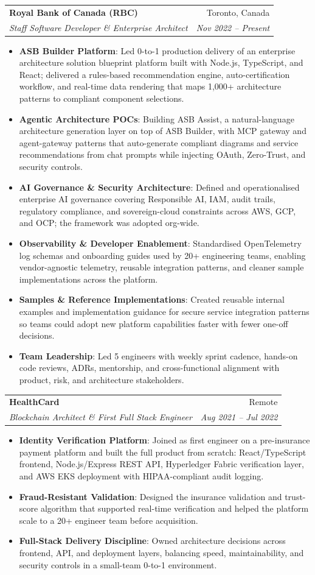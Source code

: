 \documentclass[letterpaper,9.5pt]{article}
\makeatletter
\newcommand{\resumeItem}[2]{
  \item\small{
    \textbf{#1}{: #2 \vspace{-2pt}}
  }
}
\newcommand{\resumeSubheading}[4]{
  \vspace{-1pt}\item
    \begin{tabular*}{0.97\textwidth}{l@{\extracolsep{\fill}}r}
      \textbf{#1} & #2 \\
      \textit{\small#3} & \textit{\small #4} \\
    \end{tabular*}\vspace{-5pt}
}
\newcommand{\resumeItemListStart}{\begin{itemize}}
\newcommand{\resumeItemListEnd}{\end{itemize}\vspace{-5pt}}
\makeatother
\begin{document}
  \resumeSubheading
    {Royal Bank of Canada (RBC)}{Toronto, Canada}
    {Staff Software Developer \& Enterprise Architect}{Nov 2022 -- Present}
    \resumeItemListStart
      \resumeItem{ASB Builder Platform}
        {Led 0-to-1 production delivery of an enterprise architecture solution blueprint platform built with Node.js, TypeScript, and React; delivered a rules-based recommendation engine, auto-certification workflow, and real-time data rendering that maps 1,000+ architecture patterns to compliant component selections.}
      \resumeItem{Agentic Architecture POCs}
        {Building ASB Assist, a natural-language architecture generation layer on top of ASB Builder, with MCP gateway and agent-gateway patterns that auto-generate compliant diagrams and service recommendations from chat prompts while injecting OAuth, Zero-Trust, and security controls.}
      \resumeItem{AI Governance \& Security Architecture}
        {Defined and operationalised enterprise AI governance covering Responsible AI, IAM, audit trails, regulatory compliance, and sovereign-cloud constraints across AWS, GCP, and OCP; the framework was adopted org-wide.}
      \resumeItem{Observability \& Developer Enablement}
        {Standardised OpenTelemetry log schemas and onboarding guides used by 20+ engineering teams, enabling vendor-agnostic telemetry, reusable integration patterns, and cleaner sample implementations across the platform.}
      \resumeItem{Samples \& Reference Implementations}
        {Created reusable internal examples and implementation guidance for secure service integration patterns so teams could adopt new platform capabilities faster with fewer one-off decisions.}
      \resumeItem{Team Leadership}
        {Led 5 engineers with weekly sprint cadence, hands-on code reviews, ADRs, mentorship, and cross-functional alignment with product, risk, and architecture stakeholders.}
    \resumeItemListEnd

  \resumeSubheading
    {HealthCard}{Remote}
    {Blockchain Architect \& First Full Stack Engineer}{Aug 2021 -- Jul 2022}
    \resumeItemListStart
      \resumeItem{Identity Verification Platform}
        {Joined as first engineer on a pre-insurance payment platform and built the full product from scratch: React/TypeScript frontend, Node.js/Express REST API, Hyperledger Fabric verification layer, and AWS EKS deployment with HIPAA-compliant audit logging.}
      \resumeItem{Fraud-Resistant Validation}
        {Designed the insurance validation and trust-score algorithm that supported real-time verification and helped the platform scale to a 20+ engineer team before acquisition.}
      \resumeItem{Full-Stack Delivery Discipline}
        {Owned architecture decisions across frontend, API, and deployment layers, balancing speed, maintainability, and security controls in a small-team 0-to-1 environment.}
    \resumeItemListEnd
\end{document}
